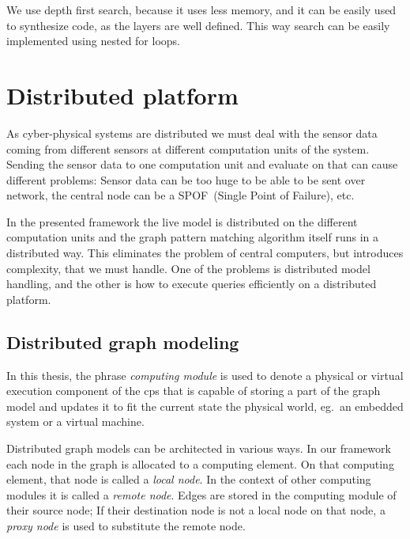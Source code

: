 We use depth first search, because it uses less memory, and it can be easily used to synthesize code, as the layers are well defined. This way search can be easily implemented using nested for loops.


\section{Distributed platform}


As cyber-physical systems are distributed we must deal with the sensor data coming from different sensors at different computation units of the system. 
Sending the sensor data to one computation unit and evaluate on that can cause different problems: 
Sensor data can be too huge to be able to be sent over network, the central node can be a SPOF~(Single Point of Failure), etc. 

In the presented framework the live model is distributed on the different computation units and the graph pattern matching algorithm itself runs in a distributed way. 
This eliminates the problem of central computers, but introduces complexity, that we must handle.
One of the problems is distributed model handling, and the other is how to execute queries efficiently on a distributed platform.

\subsection{Distributed graph modeling}

In this thesis, the phrase \emph{computing module} is used to denote a physical or virtual execution component of the cps that is capable of storing a part of the graph model and updates it to fit the current state the physical world, eg.\ an embedded system or a virtual machine.

Distributed graph models can be architected in various ways. 
In our framework each node in the graph is allocated to a computing element. 
On that computing element, that node is called a \emph{local node}. 
In the context of other computing modules it is called a \emph{remote node}. 
Edges are stored in the computing module of their source node; 
If their destination node is not a local node on that node, a \emph{proxy node} is used to substitute the remote node.


